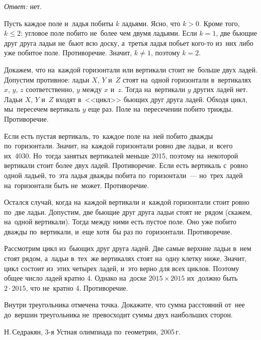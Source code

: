 \ifincludesolutions
\emph{Ответ:} нет.
\par
Пусть каждое поле и~ладья побиты $k$ ладьями.
Ясно, что $k > 0$.
Кроме того, $k \leq 2$: угловое поле побито не~более чем двумя ладьями.
Если $k = 1$, две бьющие друг друга ладьи не~бьют всю доску, а~третья ладья
побьет кого-то из~них либо уже побитое поле.
Противоречие.
Значит, $k \neq 1$, поэтому $k = 2$.
\par
Докажем, что на~каждой горизонтали или вертикали стоит не~больше двух ладей.
Допустим противное: ладьи $X$, $Y$ и~$Z$ стоят на~одной горизонтали
в~вертикалях $x$, $y$, $z$ соответственно, $y$ между $x$ и~$z$.
Тогда на~вертикали $y$ других ладей нет.
Ладьи $X$, $Y$ и~$Z$ входят в~<<цикл>> бьющих друг друга ладей.
Обходя цикл, мы~пересечем вертикаль $y$ еще раз.
Поле на~пересечении побито трижды.
Противоречие.
\par
Если есть пустая вертикаль, то~каждое поле на~ней побито дважды по~горизонтали.
Значит, на~каждой горизонтали ровно две ладьи, и~всего их~4030.
Но~тогда занятых вертикалей меньше 2015, поэтому на~некоторой вертикали стоит
более двух ладей.
Противоречие.
Если есть вертикаль с~ровно одной ладьей, то~эта ладья дважды побита
по~горизонтали~--- но~трех ладей на~горизонтали быть не~может.
Противоречие.
\par
Остался случай, когда на~каждой вертикали и~каждой горизонтали стоит ровно
по~две ладьи.
Допустим, две бьющие друг друга ладьи стоят не~рядом (скажем, на~одной
вертикали).
Тогда между ними есть пустое поле.
Оно уже побито дважды по~вертикали, и~еще хотя~бы раз по~горизонтали.
Противоречие.
\par
Рассмотрим цикл из~бьющих друг друга ладей.
Две самые верхние ладьи в~нем стоят рядом, а~ладьи в~тех~же вертикалях стоят
на~одну клетку ниже.
Значит, цикл состоит из~этих четырех ладей, и~это верно для всех циклов.
Поэтому общее число ладей кратно 4.
Однако на~доске $2015 \times 2015$ их~должно быть $2 \cdot 2015$, что
не~кратно 4.
Противоречие.
\fi %

\begin{problems}


\item
{}
Внутри треугольника отмечена точка.
Докажите, что сумма расстояний от~нее до~вершин треугольника не~превосходит
суммы двух наибольших сторон.
\begingroup\em\small\par\strut\hfill
    Н.\,Седракян, 3-я Устная олимпиада по~геометрии, 2005\,г.
\endgroup
\end{problems}

